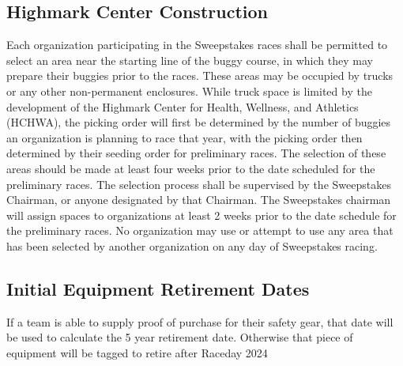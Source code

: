 \subsection*{Highmark Center Construction} \label{Seeding Area}
Each organization participating in the Sweepstakes races shall be permitted to select an area near the starting line of the buggy course, in which they may prepare their buggies prior to the races. These areas may be occupied by trucks or any other non-permanent enclosures. While truck space is limited by the development of the Highmark Center for Health, Wellness, and Athletics (HCHWA), the picking order will first be determined by the number of buggies an organization is planning to race that year, with the picking order then determined by their seeding order for preliminary races. The selection of these areas should be made at least four weeks prior to the date scheduled for the preliminary races. The selection process shall be supervised by the Sweepstakes Chairman, or anyone designated by that Chairman. The Sweepstakes chairman will assign spaces to organizations at least 2 weeks prior to the date schedule for the preliminary races. No organization may use or attempt to use any area that has been selected by another organization on any day of Sweepstakes racing.

\subsection*{Initial Equipment Retirement Dates}
If a team is able to supply proof of purchase for their safety gear, that date will be used to calculate the 5 year retirement date. Otherwise that piece of equipment will be tagged to retire after Raceday 2024